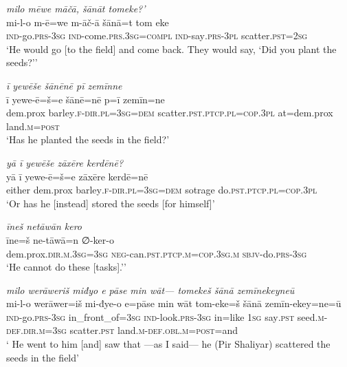 \ea \label{ŽP.39}
\textit{milo mēwe māčā, šānāt tomeke?’} \\ 
\gll mi-l-o m-ē=we m-āč-ā šānā=t tom eke \\ 
 \textsc{ind-}go\textsc{.prs}\textsc{-3sg} \textsc{ind-}come\textsc{.prs}\textsc{.3sg}\textsc{=compl} \textsc{ind-}say\textsc{.prs}\textsc{-3pl} scatter\textsc{.pst}\textsc{=\textsc{2sg}} \\ 
\glt `He would go [to the field] and come back. They would say, ‘Did you plant the seeds?’'
\z 
 
\ea \label{ŽP.44}
\textit{ī yewēše šānēnē pī zemīnne} \\ 
\gll ī yewe-ē=š=e šānē=nē p=ī zemīn=ne \\ 
 dem.prox barley\textsc{.f}\textsc{-dir}\textsc{.pl}\textsc{=3sg}\textsc{=dem} scatter\textsc{.pst}\textsc{.ptcp}\textsc{.pl}\textsc{=cop}\textsc{.3pl} at=dem.prox land\textsc{.m}\textsc{=\textsc{post}} \\ 
\glt `Has he planted the seeds in the field?'
\z 
 
\ea \label{ŽP.45}
\textit{yā ī yewēše zāxēre kerdēnē?} \\ 
\gll yā ī yewe-ē=š=e zāxēre kerdē=nē \\ 
 either dem.prox barley\textsc{.f}\textsc{-dir}\textsc{.pl}\textsc{=3sg}\textsc{=dem} sotrage do\textsc{.pst}\textsc{.ptcp}\textsc{.pl}\textsc{=cop}\textsc{.3pl} \\ 
\glt `Or has he [instead] stored the seeds [for himself]'
\z 
 
\ea \label{ŽP.49}
\textit{īneš netāwān kero} \\ 
\gll īne=š ne-tāwā=n ∅-ker-o \\ 
 dem.prox\textsc{.dir}\textsc{.m}\textsc{.3sg}\textsc{=3sg} \textsc{neg-}can\textsc{.pst}\textsc{.ptcp}\textsc{.m}\textsc{=cop}\textsc{.3sg}\textsc{.m} \textsc{sbjv-}do\textsc{.prs}\textsc{-3sg} \\ 
\glt `He cannot do these [tasks].’'
\z 
 
\ea \label{ŽP.51}
\textit{milo werāweriš miđyo e pāse min wāt— tomekeš šānā zemīnekeyneū} \\ 
\gll mi-l-o werāwer=iš mi-đye-o e=pāse min wāt tom-eke=š šānā zemīn-ekey=ne=ū \\ 
 \textsc{ind-}go\textsc{.prs}\textsc{-3sg} in\_front\_of\textsc{=3sg} \textsc{ind-}look\textsc{.prs}\textsc{-3sg} in=like \textsc{1sg} say\textsc{.pst} seed\textsc{.m}\textsc{-def}\textsc{.dir}\textsc{.m}\textsc{=3sg} scatter\textsc{.pst} land\textsc{.m}\textsc{-def}\textsc{.obl}\textsc{.m}\textsc{=\textsc{post}}=and \\ 
\glt ` He went to him [and] saw that —as I said— he (Pir Shaliyar) scattered the seeds in the field'
\z 
 
